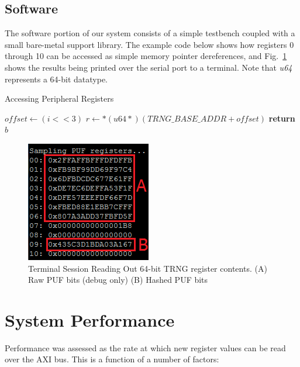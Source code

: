 \documentclass[journal]{IEEEtran}
\begin{document}
\subsection{Software}

The software portion of our system consists of a simple testbench coupled with a small bare-metal support library. The example code below shows how registers 0 through 10 can be accessed as simple memory pointer dereferences, and Fig.~\ref{fig:dump} shows the results being printed over the serial port to a terminal. Note that \emph{u64} represents a 64-bit datatype. 

\begin{algorithm}
  \caption{Accessing Peripheral Registers}\label{euclid}
  \begin{algorithmic}[1]
	\State $offset\gets (i<<3)$
        \State $r\gets *( u64 *) (TRNG\_BASE\_ADDR+offset)$
      \EndFor
      \State \textbf{return} $b$
    \EndProcedure
  \end{algorithmic}
\end{algorithm}


\begin{figure}[!th]
\centering
\includegraphics[scale=.9]{Images/dump2.png}
\caption{ Terminal Session Reading Out 64-bit TRNG register contents. (A) Raw PUF bits (debug only) (B) Hashed PUF bits}
\label{fig:dump}
\end{figure} 


\section{System Performance}

Performance was assessed as the rate at which new register values can be read over the AXI bus. This is a function of a number of factors:
\end{document}

